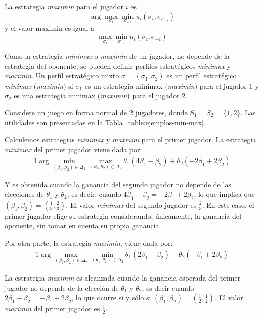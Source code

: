 \begin{definition}
La estrategia \textit{maximin} para el jugador $i$ es 
$$\arg \max_{\sigma_i}{\min_{\sigma_{-i}}{u_i(\sigma_i, \sigma_{\sigma_{-i}})}}$$ y el valor maximin es igual a $$\max_{\sigma_i}{\min_{\sigma_{-i}}{u_i(\sigma_i, \sigma_{-i})}}$$
\end{definition}

Como la estrategia \textit{minimax} o \textit{maximin} de un jugador, no depende de la estrategia del oponente, se pueden definir perfiles estratégicos \textit{minimax} y \textit{maximin}. Un perfil estratégico mixto $\sigma = (\sigma_1, \sigma_2)$ es un perfil estratégico \textit{minimax} (\textit{maximin}) si $\sigma_1$ es un estrategia minimax (\textit{maximin}) para el jugador $1$ y $\sigma_2$ es una estrategia minimax (\textit{maximin}) para el jugador $2$.

\begin{example}
\label{ex:ejemplos-min-max}
Considere un juego en forma normal de $2$ jugadores, donde $S_1 = S_2 = \{1, 2\}$. Las utilidades son presentadas en la Tabla~\ref{table:ejemplos-min-max}.
\end{example}

Calculemos estrategias \textit{minimax} y \textit{maxmini} para el primer jugador. La estrategia \textit{minimax} del primer jugador viene dada por:
\begin{alignat}{1}
\arg \min_{(\beta_1, \beta_2) \in \Delta_2 }{\max_{(\theta_1, \theta_2) \in \Delta_2}
{\theta_1(4\beta_1 -\beta_2) + \theta_2(-2\beta_1 + 2\beta_2)}}
\end{alignat}

Y es obtenida cuando la ganancia del segundo jugador no depende de las elecciones de $\theta_1$ y $\theta_2$, es decir, cuando $4\beta_1 - \beta_2 = -2\beta_1 + 2\beta_2$, lo que implica que $(\beta_1, \beta_2) = \left(\frac{1}{3}, \frac{2}{3} \right)$. El valor \textit{minimax} del segundo jugador es $\frac{2}{3}$. En este caso, el primer jugador elige su estrategia considerando, únicamente, la ganancia del oponente, sin tomar en cuenta su propia ganancia.

Por otra parte, la estrategia \textit{maximin}, viene dada por:
\begin{alignat}{1}
\arg \max_{(\beta_1, \beta_2) \in \Delta_2 }{\min_{(\theta_1, \theta_2) \in \Delta_2}
{\theta_1(2\beta_1 -\beta_2) + \theta_2(-\beta_1 + 2\beta_2)}}
\end{alignat}

La estrategia \textit{maximin} es alcanzada cuando la ganancia esperada del primer jugador no depende de la elección de $\theta_1$ y $\theta_2$, es decir cuando $2\beta_1 - \beta_2 = -\beta_1 + 2\beta_2$, lo que ocurre si y sólo si $(\beta_1, \beta_2) = \left(\frac{1}{2}, \frac{1}{2}\right)$. El valor \textit{maximin} del primer jugador es $\frac{1}{2}$.


